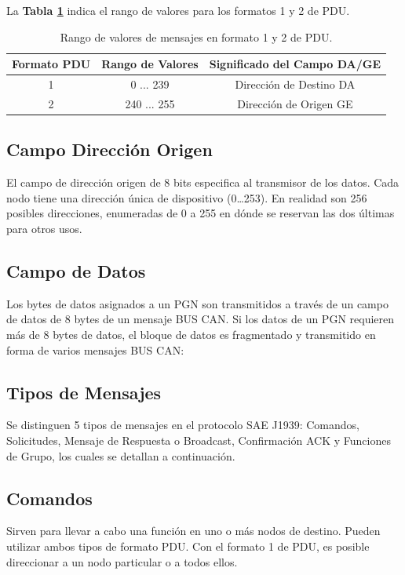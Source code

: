 La \textbf{Tabla \ref{rango}} indica el rango de valores para los formatos 1 y 2 de PDU.
\begin{table}[htb]
\begin{center}
\begin{tabular}{c c c}
\toprule
Formato PDU & Rango de Valores & Significado del Campo DA/GE \\
\midrule
1 &   0 ... 239 & Dirección de Destino DA\\ %
2 & 240 ... 255 & Dirección de Origen GE\\ %
\bottomrule
\end{tabular}
\caption{Rango de valores de mensajes en formato 1 y 2 de PDU.}
\label{rango}
\end{center}
\end{table}


\subsection{Campo Dirección Origen}

El campo de dirección origen de 8 bits especifica al transmisor de los datos. Cada nodo tiene una dirección única de dispositivo (0…253). En realidad son 256 posibles direcciones, enumeradas de 0 a 255 en dónde se reservan las dos últimas para otros usos.

\subsection{Campo de Datos}
Los bytes de datos asignados a un PGN son transmitidos a través de un campo de datos de 8 bytes de un mensaje BUS CAN. Si los datos de un PGN requieren más de 8 bytes de datos, el bloque de datos es fragmentado y transmitido en forma de varios mensajes BUS CAN:

\subsection{Tipos de Mensajes}
Se distinguen 5 tipos de mensajes en el protocolo SAE J1939: Comandos, Solicitudes, Mensaje de Respuesta o Broadcast, Confirmación ACK y Funciones de Grupo, los cuales se detallan a continuación. 

\subsection{Comandos}
Sirven para llevar a cabo una función en uno o más nodos de destino. Pueden utilizar ambos tipos de formato PDU. Con el formato 1 de PDU, es posible direccionar a un nodo particular o a todos ellos. 
